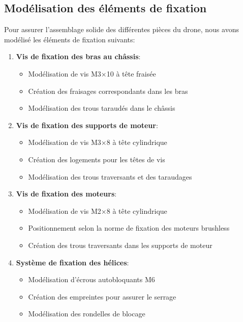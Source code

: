 \documentclass[a4paper,12pt]{report}
\begin{document}
\subsection{Modélisation des éléments de fixation}
Pour assurer l'assemblage solide des différentes pièces du drone, nous avons modélisé les éléments de fixation suivants:
\begin{enumerate}
    \item \textbf{Vis de fixation des bras au châssis}:
    \begin{itemize}
        \item Modélisation de vis M3×10 à tête fraisée
        \item Création des fraisages correspondants dans les bras
        \item Modélisation des trous taraudés dans le châssis
    \end{itemize}
    
    \item \textbf{Vis de fixation des supports de moteur}:
    \begin{itemize}
        \item Modélisation de vis M3×8 à tête cylindrique
        \item Création des logements pour les têtes de vis
        \item Modélisation des trous traversants et des taraudages
    \end{itemize}
    
    \item \textbf{Vis de fixation des moteurs}:
    \begin{itemize}
        \item Modélisation de vis M2×8 à tête cylindrique
        \item Positionnement selon la norme de fixation des moteurs brushless
        \item Création des trous traversants dans les supports de moteur
    \end{itemize}
    
    \item \textbf{Système de fixation des hélices}:
    \begin{itemize}
        \item Modélisation d'écrous autobloquants M6
        \item Création des empreintes pour assurer le serrage
        \item Modélisation des rondelles de blocage
    \end{itemize}
\end{enumerate}
\end{document}
